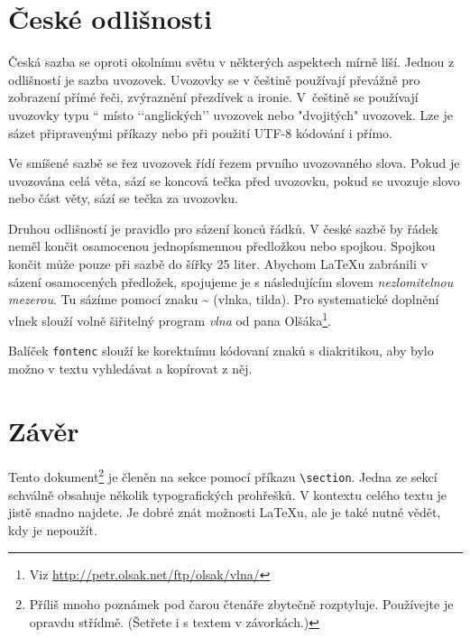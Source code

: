 \documentclass[a4paper,10pt,twocolumn]{article}
\newcommand{\myuv}[1]{\quotedblbase #1\textquotedblleft}
\begin{document}
\section{České odlišnosti}
Česká sazba se oproti okolnímu světu v některých aspektech mírně liší. Jednou z odlišností je sazba uvozovek. Uvozovky se v češtině používají převážně pro zobrazení přímé řeči, zvýraznění přezdívek a ironie. V~češtině se používají uvozovky typu \myuv{9966} místo ‘‘anglických’’ uvozovek nebo "dvojitých" uvozovek. Lze je sázet připravenými příkazy nebo při použití UTF-8 kódování i přímo.

Ve smíšené sazbě se řez uvozovek řídí řezem prvního uvozovaného slova. Pokud je uvozována celá věta, sází se koncová tečka před uvozovku, pokud se uvozuje slovo nebo část věty, sází se tečka za uvozovku.

Druhou odlišností je pravidlo pro sázení konců řádků. V české sazbě by řádek neměl končit osamocenou jednopísmennou předložkou nebo spojkou. Spojkou  končit může pouze při sazbě do šířky 25 liter. Abychom LaTeXu zabránili v sázení osamocených předložek, spojujeme je s následujícím slovem \emph{nezlomitelnou mezerou}. Tu sázíme pomocí znaku \textbf{\~{}} (vlnka, tilda). Pro systematické doplnění vlnek slouží volně šiřitelný program \emph{vlna} od pana Olšáka\footnote{Viz \url{http://petr.olsak.net/ftp/olsak/vlna/}}.

Balíček \texttt{fontenc} slouží ke korektnímu kódovaní znaků s diakritikou, aby bylo možno v textu vyhledávat a kopírovat z něj.

\section{Závěr}
Tento dokument\footnote{Příliš mnoho poznámek pod čarou čtenáře zbytečně rozptyluje. Používejte je opravdu střídmě. (Šetřete i s textem v závorkách.)
} je členěn na sekce pomocí příkazu \verb|\section|. Jedna ze sekcí schválně obsahuje několik typografických prohřešků. V kontextu celého textu je jistě snadno najdete. Je dobré znát možnosti \LaTeX u, ale je také nutné vědět, kdy je nepoužít.
\end{document}

